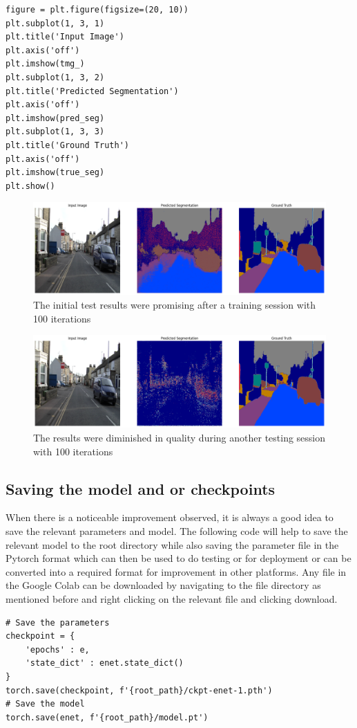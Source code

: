 \begin{enumerate}
\begin{lstlisting}
figure = plt.figure(figsize=(20, 10))
plt.subplot(1, 3, 1)
plt.title('Input Image')
plt.axis('off')
plt.imshow(tmg_)
plt.subplot(1, 3, 2)
plt.title('Predicted Segmentation')
plt.axis('off')
plt.imshow(pred_seg)
plt.subplot(1, 3, 3)
plt.title('Ground Truth')
plt.axis('off')
plt.imshow(true_seg)
plt.show()
\end{lstlisting}
          \begin{figure}[H]
              \centering
              \includegraphics[width=450pt]{assets/enet/camvid/out1.png}
              \caption{The initial test results were promising after a training session with 100 iterations}
              \label{fig:using:test4}
          \end{figure}
          \begin{figure}[H]
              \centering
              \includegraphics[width=450pt]{assets/enet/camvid/out1alt.png}
              \caption{The results were diminished in quality during another testing session with 100 iterations}
              \label{fig:using:test6}
          \end{figure}
\end{enumerate}



\subsection*{Saving the model and or checkpoints}
When there is a noticeable improvement observed, it is always a good idea to save the relevant parameters and model. The following code will help to save the relevant model to the root directory while also saving the parameter file in the Pytorch format which can then be used to do testing or for deployment or can be converted into a required format for improvement in other platforms. Any file in the Google Colab can be downloaded by navigating to the file directory as mentioned before and right clicking on the relevant file and clicking download.
\begin{lstlisting}
# Save the parameters
checkpoint = {
    'epochs' : e,
    'state_dict' : enet.state_dict()
}
torch.save(checkpoint, f'{root_path}/ckpt-enet-1.pth')
# Save the model
torch.save(enet, f'{root_path}/model.pt')
\end{lstlisting}

